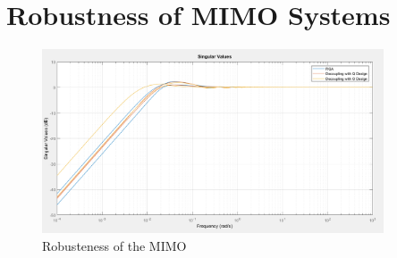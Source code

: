 \section{Robustness of MIMO Systems}
\label{c:robustness:s:mimo}

\begin{figure}[H]
\begin{minipage}[b]{\textwidth}
\centering
\includegraphics[width=0.9\textwidth]{./Graphics/SVD_MATLAB.png}
\caption{Robusteness of the MIMO}
\label{c:robustness:f:mimo_svd}
\end{minipage}
\end{figure}
